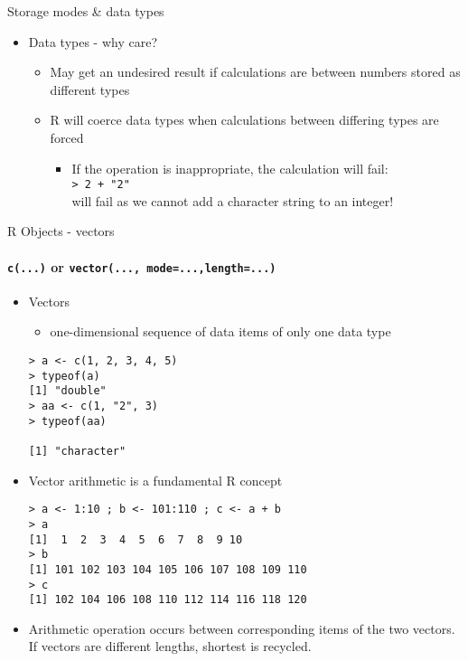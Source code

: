 \documentclass{beamer}
\begin{document}
\begin{frame}{Storage modes \& data types}
    \begin{itemize}
        \item Data types - why care?
        \begin{itemize}
            \item May get an undesired result if calculations are between numbers stored as different types
            \item R will coerce data types when calculations between differing types are forced
            \begin{itemize}
                \item If the operation is inappropriate, the calculation will fail:\\
                {\tt > 2 + "2"}\\
                will fail as we cannot add a character string to an integer!
            \end{itemize}
        \end{itemize}
    \end{itemize}
\end{frame}

\begin{frame}{R Objects - vectors}
    \framesubtitle{{\tt c(...)} or {\tt vector(..., mode=...,length=...)}}
    \begin{itemize}
        \item Vectors
        \begin{itemize}
            \item one-dimensional sequence of data items of only one data type
        \end{itemize}
        \begin{verbatim}
> a <- c(1, 2, 3, 4, 5)
> typeof(a)‏
[1] "double"
> aa <- c(1, "2", 3)‏
> typeof(aa)

[1] "character"\end{verbatim}

        \item Vector arithmetic is a fundamental R concept 
        \begin{verbatim}
> a <- 1:10 ; b <- 101:110 ; c <- a + b
> a
[1]  1  2  3  4  5  6  7  8  9 10
> b
[1] 101 102 103 104 105 106 107 108 109 110
> c
[1] 102 104 106 108 110 112 114 116 118 120\end{verbatim}
        \item Arithmetic operation occurs between corresponding items of the two vectors. If vectors are different lengths, shortest is recycled.
    \end{itemize}
\end{frame}
\end{document}
